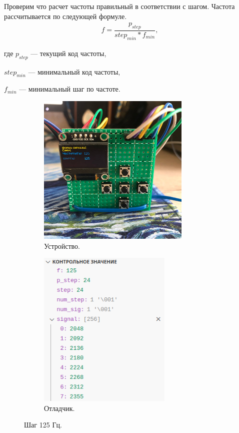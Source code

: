 	Проверим что расчет частоты правильный в соответствии с шагом. Частота рассчитывается по следующей формуле.
	\begin{gather}
	f = \dfrac{p_{step}}{step_{min}*f_{min}},
	\end{gather}
	
	где $p_{step}$ --- текущий код частоты,
	
	$step_{min}$ --- минимальный код частоты,
	
	$f_{min}$ --- минимальный шаг по частоте.
	
	\begin{figure}[H]
     \begin{subfigure}[H]{0.5\textwidth}
         \centering
         \includegraphics[width=0.8\textwidth]{../image/test1_u_f.jpg}
         \caption{Устройство.}
     \end{subfigure}
     \hfill
     \begin{subfigure}[H]{0.5\textwidth}
         \centering
         \includegraphics[width=0.7\textwidth]{../image/test1_o_f.png}
         \caption{Отладчик.}
     \end{subfigure}
        \caption{Шаг 125 Гц.}
	\end{figure}
	
